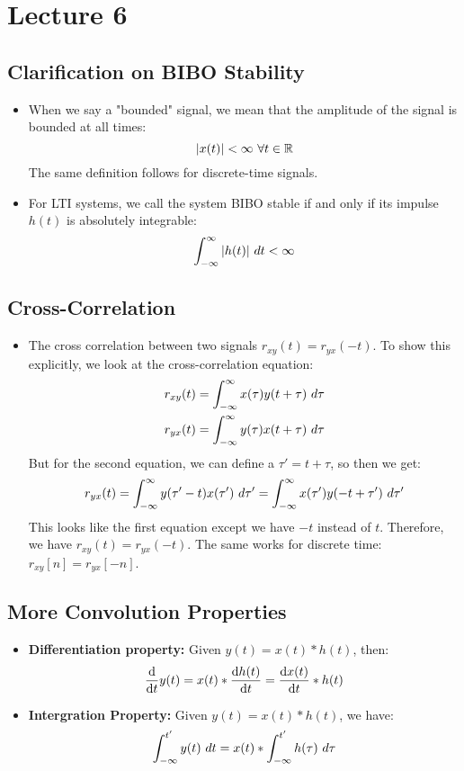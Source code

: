 \section{Lecture 6}
\subsection{Clarification on BIBO Stability}
\begin{itemize}
	\item When we say a "bounded" signal, we mean that the amplitude of the signal is bounded at all times:
		\[
		|x(t)| < \infty \ \forall t \in \mathbb R
		\] 
		The same definition follows for discrete-time signals. 
	\item For LTI systems, we call the system BIBO stable if and only if its impulse \( h(t) \) is absolutely 
		integrable:
		\[
		\int_{-\infty}^{\infty} |h(t)| \ d t < \infty
		\] 
\end{itemize}
\subsection{Cross-Correlation}
\begin{itemize}
	\item The cross correlation between two signals \( r_{xy}(t) = r_{yx}(-t) \). To show this explicitly, we 
		look at the cross-correlation equation:
		\begin{align*}
			r_{xy}(t) &= \int_{-\infty}^{\infty} x(\tau)y(t + \tau) \ d \tau \\
			r_{yx}(t) &= \int_{-\infty}^{\infty} y(\tau) x(t + \tau) \ d \tau  
	\end{align*} 
	But for the second equation, we can define a \( \tau' = t + \tau\), so then we get: 
	\[
	r_{yx}(t) = \int_{-\infty}^{\infty} y(\tau' - t)x(\tau') \ d \tau' = \int_{-\infty}^{\infty} 
	x(\tau') y(-t + \tau') \ d \tau'
	\] 
	This looks like the first equation except we have \( -t \) instead of \( t \). Therefore, we have 
	\( r_{xy}(t) = r_{yx}(-t) \). The same works for discrete time: \( r_{xy}[n] = r_{yx}[-n] \). 
\end{itemize}

\subsection{More Convolution Properties} 
\begin{itemize}
	\item \textbf{Differentiation property:} Given \( y(t) = x(t) * h(t) \), then:
		\[
			\dv{t} y(t) = x(t) * \dv{h(t)}{t} = \dv{x(t)}{t} * h(t)
		\] 
	\item \textbf{Intergration Property:} Given \( y(t) = x(t) * h(t) \), we have:
		\[
		\int_{-\infty}^{t'} y(t) \ d  t = x(t) * \int_{-\infty}^{t'} h(\tau)\ d \tau 
		\] 
\end{itemize}
